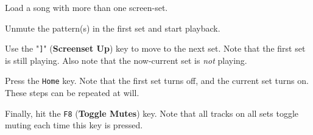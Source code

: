    \begin{enumber}
      \item Load a song with more than one screen-set.
      \item Unmute the pattern(s) in the first set and start playback.
      \item Use the "\texttt{]}" (\textbf{Screenset Up}) key to move to the next
         set.  Note that the first set is still playing.  Also note that the
         now-current set is \textsl{not} playing.
      \item Press the \texttt{Home} key.
         Note that the first set turns off, and the current set turns on.
         These steps can be repeated at will.
      \item Finally, hit the \texttt{F8} (\textbf{Toggle Mutes}) key.
         Note that all tracks on all sets toggle muting each time this key is
         pressed.
   \end{enumber}

